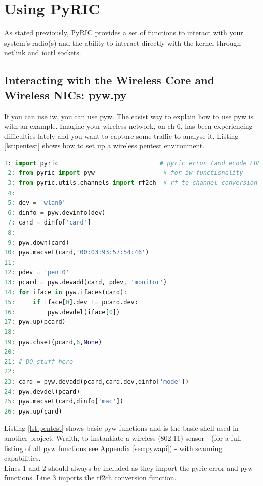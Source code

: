 \documentclass[11pt]{article}
\begin{document}
\section{Using PyRIC}\label{sec:using}
As stated previously, PyRIC provides a set of functions to interact with your 
system's radio(s) and the ability to interact directly with the kernel through
netlink and ioctl sockets.

\subsection{Interacting with the Wireless Core and Wireless NICs: pyw.py}
If you can use iw, you can use pyw. The easist way to explain how to use pyw is 
with an example. Imagine your wireless network, on ch 6, has been experiencing 
difficulties lately and you want to capture some traffic to analyse it. Listing 
\ref{lst:pentest} shows how to set up a wireless pentest environment. \\

\begin{lstlisting}[caption={Setting up a Wireless Pentest Environment},
                   label={lst:pentest},
                   language=Python]
 1: import pyric                            # pyric error (and ecode EUNDEF)
 2: from pyric import pyw                   # for iw functionality
 3: from pyric.utils.channels import rf2ch  # rf to channel conversion
 4:
 5: dev = 'wlan0' 
 6: dinfo = pyw.devinfo(dev)
 7: card = dinfo['card']
 8:
 9: pyw.down(card)
10: pyw.macset(card,'00:03:93:57:54:46')
11:
12: pdev = 'pent0'
13: pcard = pyw.devadd(card, pdev, 'monitor')
14: for iface in pyw.ifaces(card):
15: 	if iface[0].dev != pcard.dev:
16:         pyw.devdel(iface[0])
17: pyw.up(pcard)
18:
19: pyw.chset(pcard,6,None)
20:
21: # DO stuff here
22:
23: card = pyw.devadd(pcard,card.dev,dinfo['mode'])
24: pyw.devdel(pcard)
25: pyw.macset(card,dinfo['mac'])
26: pyw.up(card)
\end{lstlisting}

Listing \ref{lst:pentest} shows basic pyw functions and is the basic shell used in 
another project, Wraith\cite{wraith}, to instantiate a wireless (802.11) sensor - 
(for a full listing of all pyw functions see Appendix \ref{sec:pywapi}) - with 
scanning capabilities. \\

Lines 1 and 2 should always be included as they import the pyric error and pyw 
functions. Line 3 imports the rf2ch conversion function. \\
\end{document}
